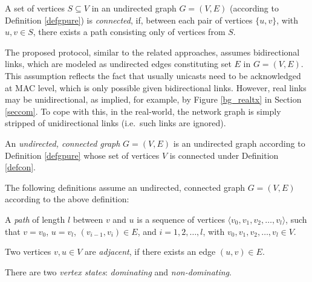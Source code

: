 \begin{definition}\label{defcon}

A set of vertices $S\subseteq V$ in an undirected graph $G = (V,E)$ (according to Definition \ref{defgpure}) is \emph{connected}, if, between each pair of vertices $\{u,v\}$, with $u,v \in S$, there exists a path consisting only of vertices from $S$.

\end{definition}

The proposed protocol, similar to the related approaches, assumes bidirectional links, which are modeled as undirected edges constituting set $E$ in $G=(V,E)$. This assumption reflects the fact that usually unicasts need to be acknowledged at MAC level, which is only possible given bidirectional links. However, real links may be unidirectional, as implied, for example, by Figure \ref{bg_realtx} in Section \ref{seccom}. To cope with this, in the real-world, the network graph is simply stripped of unidirectional links (i.e.\ such links are ignored).


\begin{definition}\label{defg}

An \emph{undirected, connected graph} $G = (V,E)$ is an undirected graph according to Definition \ref{defgpure} whose set of vertices $V$ is connected under Definition \ref{defcon}.

\end{definition}

The following definitions assume an undirected, connected graph $G=(V,E)$ according to the above definition:

\begin{definition}\label{defpath}

A \emph{path} of length $l$ between $v$ and $u$ is a sequence of vertices $\langle v_0,v_1,v_2,\ldots,v_l \rangle$, such that $v=v_0$, $u=v_l$, $(v_{i-1},v_i) \in E$, and $i=1,2,\ldots,l$, with $v_0,v_1,v_2,\ldots,v_l \in V$.

\end{definition}

\begin{definition}\label{defadjacent}

Two vertices $v, u\in V$ are \emph{adjacent}, if there exists an edge $(u,v)\in E$.

\end{definition}

There are two \emph{vertex states}: \emph{dominating} and \emph{non-dominating}. 

